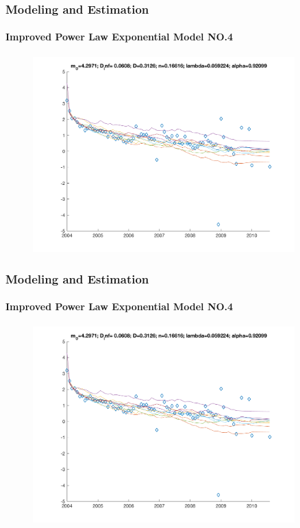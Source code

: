 \documentclass[11pt]{beamer}
\begin{document}
\begin{frame}
	\frametitle{Modeling and Estimation}
	\framesubtitle{Improved Power Law Exponential Model NO.4}
	\justifying
\begin{figure}
\begin{center}
\includegraphics[width=0.9\textwidth  ]{AAplot_12} 
\end{center}
\end{figure}				
\end{frame}	

\begin{frame}
	\frametitle{Modeling and Estimation}
	\framesubtitle{Improved Power Law Exponential Model NO.4}
	\justifying
\begin{figure}
\begin{center}
\includegraphics[width=0.9\textwidth  ]{AAplot_12} 
\end{center}
\end{figure}				
\end{frame}	
\end{document}
